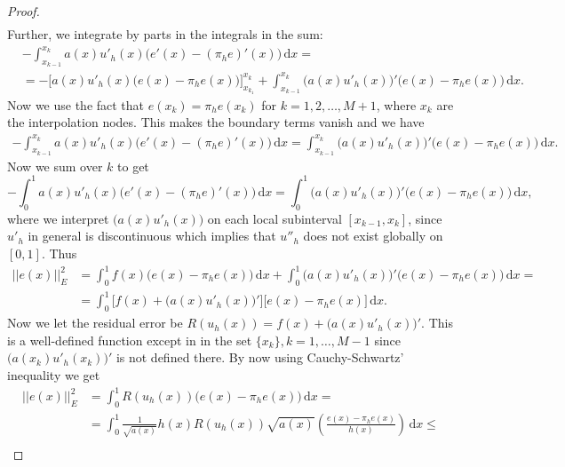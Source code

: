 \documentclass[12pt, a4paper]{article}
\newcommand{\rd}{\ensuremath{\mathrm{d}}}
\newcommand{\id}{\ensuremath{\,\rd}}
\numberwithin{equation}{section}
\begin{document}
\begin{proof}
\begin{equation*}
\begin{split}
\end{split}
\end{equation*}
Further, we integrate by parts in the integrals in the sum:
\begin{equation*}
\begin{split}
& -\int_{x_{k-1}}^{x_k} a(x) u'_h(x)\big( e'(x)-(\pi_he)'(x)\big)\id x = \\
&=- \Big[ a(x)u'_h(x)\big( e(x)-\pi_he(x) \big) \Big]_{x_{k_1}}^{x_k} + \int_{x_{k-1}}^{x_k} \big (a(x)u'_h(x)\big)'\big(e(x)-\pi_he(x)\big)\id x.
\end{split}
\end{equation*}
Now we use the fact that $e(x_k) = \pi_he(x_k)$ for $k=1,2,\dots,M+1$, where $x_k$ are the interpolation nodes. This makes the boundary terms vanish and we have
\begin{equation*}
\begin{split}
-\int_{x_{k-1}}^{x_k} a(x)u'_h(x)\big(e'(x)-(\pi_he)'(x)\big ) \id x = \int_{x_{k-1}}^{x_k} \big( a(x)u'_h(x)\big)'\big(e(x)-\pi_he(x)\big)\id x.
\end{split}
\end{equation*}
Now we sum over $k$ to get
\begin{equation*}
-\int_0^1 a(x)u'_h(x)\big(e'(x)-(\pi_he)'(x)\big ) \id x = \int_0^1 \big( a(x)u'_h(x)\big)'\big(e(x)-\pi_he(x)\big)\id x,
\end{equation*}
\noindent where we interpret $\big(a(x)u'_h(x)\big)$ on each local subinterval $[x_{k-1}, x_k]$, since $u'_h$ in general is discontinuous which implies that $u''_h$ does not exist globally on $[0,1]$. Thus
\begin{equation*}
\begin{split}
||e(x)||^2_E &= \int_0^1 f(x)\big(e(x)-\pi_he(x)\big)\id x +\int_0^1 \big(a(x)u'_h(x)\big)'\big(e(x)-\pi_he(x)\big)\id x =\\
&= \int_0^1 \Big[f(x)+\big(a(x)u'_h(x)\big)'\Big]\Big[e(x)-\pi_he(x)\Big]\id x.
\end{split}
\end{equation*}
Now we let the residual error be $R(u_h(x)) = f(x)+\big(a(x)u'_h(x)\big)'$. This is a well-defined function except in in the set $\{x_k\}, k=1,\dots,M-1$ since $\big(a(x_k)u'_h(x_k)\big)'$ is not defined there. By now using Cauchy-Schwartz' inequality we get
\begin{equation*}
\begin{split}
||e(x)||^2_E &= \int_0^1 R(u_h(x))\big(e(x)-\pi_he(x)\big)\id x = \\
&= \int_0^1 \frac{1}{\sqrt{a(x)}}h(x)R(u_h(x)) \sqrt{a(x)}\left( \frac{e(x)-\pi_he(x)}{h(x)}\right)\id x \leq \\

\end{split}
\end{equation*}
\end{proof}
\end{document}
